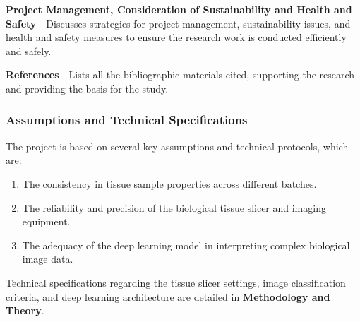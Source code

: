 \textbf{Project Management, Consideration of Sustainability and Health and Safety} - Discusses strategies for project management, sustainability issues, and health and safety measures to ensure the research work is conducted efficiently and safely.

\textbf{References} - Lists all the bibliographic materials cited, supporting the research and providing the basis for the study.









\subsubsection{Assumptions and Technical Specifications}

The project is based on several key assumptions and technical protocols, which are:

\begin{enumerate}
    \item The consistency in tissue sample properties across different batches.
    \item The reliability and precision of the biological tissue slicer and imaging equipment.
    \item The adequacy of the deep learning model in interpreting complex biological image data.
\end{enumerate}
Technical specifications regarding the tissue slicer settings, image classification criteria, and deep learning architecture are detailed in \textbf{Methodology and Theory}.

